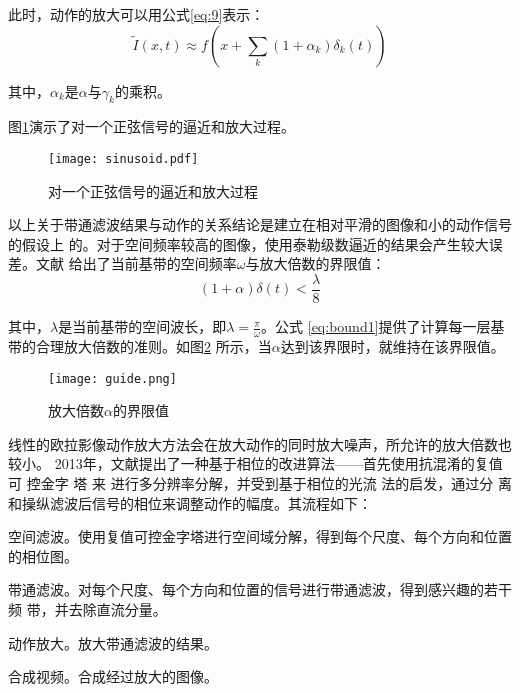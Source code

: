此时，动作的放大可以用公式\ref{eq:9}表示：
\begin{equation}
  \label{eq:9}
  \tilde {I}(x,t)\approx f(x+\sum_k(1+\alpha_{k})\delta_{k}(t))
\end{equation}

其中，$\alpha_k$是$\alpha$与$\gamma_{k}$的乘积。

图\ref{fig:sinusoid}演示了对一个正弦信号的逼近和放大过程。

\begin{figure}[htbp]
  \centering
  \texttt{[image: sinusoid.pdf]}
  \caption{对一个正弦信号的逼近和放大过程}
  \label{fig:sinusoid}
\end{figure}

以上关于带通滤波结果与动作的关系结论是建立在相对平滑的图像和小的动作信号的假设上
的。对于空间频率较高的图像，使用泰勒级数逼近的结果会产生较大误差。文献
\cite{wu2012eulerian}给出了当前基带的空间频率$\omega$与放大倍数的界限值：
\begin{equation}
  \label{eq:bound1}
  (1+\alpha)\delta(t)<\frac{\lambda}{8}
\end{equation}

其中，$\lambda$是当前基带的空间波长，即$\lambda=\frac{\pi}{\omega}$。公式
\ref{eq:bound1}提供了计算每一层基带的合理放大倍数的准则。如图\ref{fig:guide}
所示，当$\alpha$达到该界限时，就维持在该界限值。

\clearpage

\begin{figure}[htbp]
  \centering
  \texttt{[image: guide.png]}
  \caption{放大倍数$\alpha$的界限值}
  \label{fig:guide}
\end{figure}

线性的欧拉影像动作放大方法会在放大动作的同时放大噪声，所允许的放大倍数也较小。
2013年，文献\cite{Wadhwa2013PhaseBased}提出了一种基于相位的改进算法——首先使用抗混淆的复值可
控金字
塔
来
进行多分辨率分解，并受到基于相位的光流
法的启发，通过分
离和操纵滤波后信号的相位来调整动作的幅度。其流程如下：

\begin{compactenum}
\item 空间滤波。使用复值可控金字塔进行空间域分解，得到每个尺度、每个方向和位置的相位图。
\item 带通滤波。对每个尺度、每个方向和位置的信号进行带通滤波，得到感兴趣的若干频
  带，并去除直流分量。
\item 动作放大。放大带通滤波的结果。
\item 合成视频。合成经过放大的图像。
\end{compactenum}

